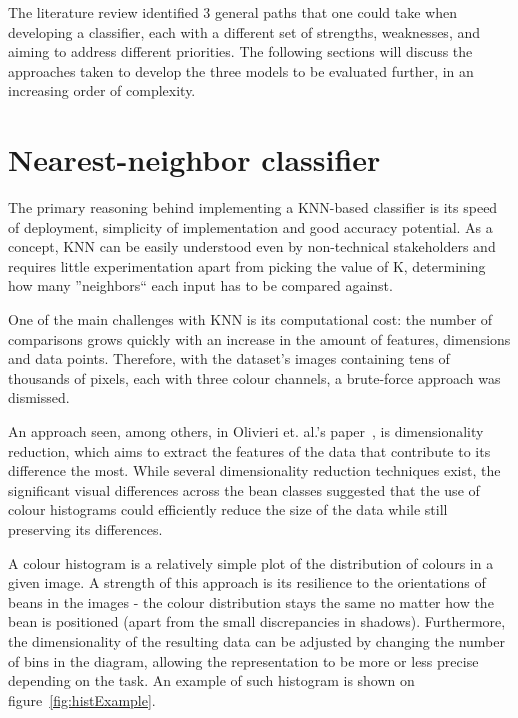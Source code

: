 The literature review identified 3 general paths that one could take when developing a classifier, each with a different
set of strengths, weaknesses, and aiming to address different priorities.
The following sections will discuss the approaches taken to develop the three models to be evaluated further, in an
increasing order of complexity.
\section{Nearest-neighbor classifier}
\label{sec:knn-classifier}
The primary reasoning behind implementing a KNN-based classifier is its speed of deployment, simplicity of implementation
and good accuracy potential.
As a concept, KNN can be easily understood even by non-technical stakeholders and requires little experimentation apart
from picking the value of K, determining how many ''neighbors`` each input has to be compared against.

One of the main challenges with KNN is its computational cost: the number of comparisons grows quickly with an increase
in the amount of features, dimensions and data points.
Therefore, with the dataset's images containing tens of thousands of pixels, each with three colour channels, a brute-force
approach was dismissed.

An approach seen, among others, in Olivieri et. al.'s paper~\cite{hyperspectralGreenOliveri}, is dimensionality reduction,
which aims to extract the features of the data that contribute to its difference the most.
While several dimensionality reduction techniques exist, the significant visual differences across the bean classes suggested
that the use of colour histograms could efficiently reduce the size of the data while still preserving its differences.

A colour histogram is a relatively simple plot of the distribution of colours in a given image.
A strength of this approach is its resilience to the orientations of beans in the images - the colour distribution stays
the same no matter how the bean is positioned (apart from the small discrepancies in shadows).
Furthermore, the dimensionality of the resulting data can be adjusted by changing the number of bins in the diagram, allowing
the representation to be more or less precise depending on the task.
An example of such histogram is shown on figure~\ref{fig:histExample}.

